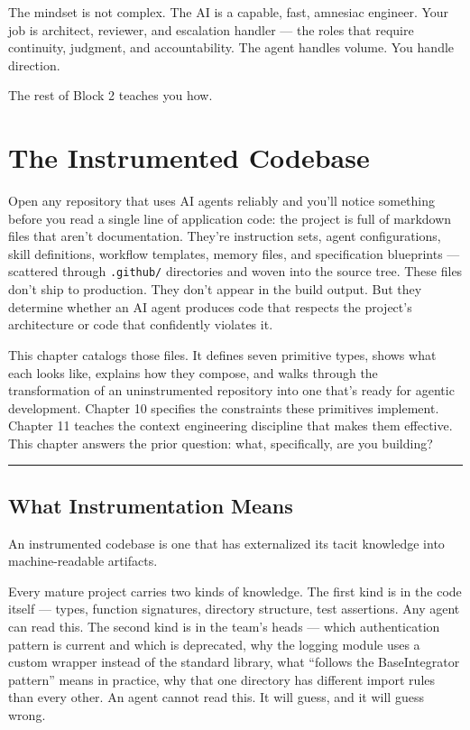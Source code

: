 \documentclass[
  a4paper,
  DIV=11,
  numbers=noendperiod]{scrreprt}
\begin{document}
The mindset is not complex. The AI is a capable, fast, amnesiac
engineer. Your job is architect, reviewer, and escalation handler ---
the roles that require continuity, judgment, and accountability. The
agent handles volume. You handle direction.

The rest of Block 2 teaches you how.

\chapter{The Instrumented Codebase}\label{the-instrumented-codebase}

Open any repository that uses AI agents reliably and you'll notice
something before you read a single line of application code: the project
is full of markdown files that aren't documentation. They're instruction
sets, agent configurations, skill definitions, workflow templates,
memory files, and specification blueprints --- scattered through
\texttt{.github/} directories and woven into the source tree. These
files don't ship to production. They don't appear in the build output.
But they determine whether an AI agent produces code that respects the
project's architecture or code that confidently violates it.

This chapter catalogs those files. It defines seven primitive types,
shows what each looks like, explains how they compose, and walks through
the transformation of an uninstrumented repository into one that's ready
for agentic development. Chapter 10 specifies the constraints these
primitives implement. Chapter 11 teaches the context engineering
discipline that makes them effective. This chapter answers the prior
question: what, specifically, are you building?

\begin{center}\rule{0.5\linewidth}{0.5pt}\end{center}

\section{What Instrumentation Means}\label{what-instrumentation-means}

An instrumented codebase is one that has externalized its tacit
knowledge into machine-readable artifacts.

Every mature project carries two kinds of knowledge. The first kind is
in the code itself --- types, function signatures, directory structure,
test assertions. Any agent can read this. The second kind is in the
team's heads --- which authentication pattern is current and which is
deprecated, why the logging module uses a custom wrapper instead of the
standard library, what ``follows the BaseIntegrator pattern'' means in
practice, why that one directory has different import rules than every
other. An agent cannot read this. It will guess, and it will guess
wrong.
\end{document}
